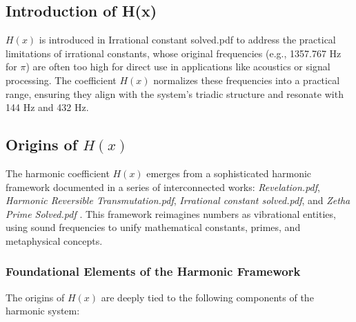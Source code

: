 \subsection{Introduction of H(x)}
\( H(x) \) is introduced in Irrational constant solved.pdf to address the practical limitations of irrational constants, whose original frequencies (e.g., 1357.767 Hz for \( \pi \)) are often too high for direct use in applications like acoustics or signal processing. The coefficient \( H(x) \) normalizes these frequencies into a practical range, ensuring they align with the system’s triadic structure and resonate with 144 Hz and 432 Hz.

\subsection{Origins of \( H(x) \)}
\label{subsec:h_x_origins}
The harmonic coefficient \( H(x) \) emerges from a sophisticated harmonic framework documented in a series of interconnected works: \textit{Revelation.pdf}, \textit{Harmonic Reversible Transmutation.pdf}, \textit{Irrational constant solved.pdf}, and \textit{Zetha Prime Solved.pdf} \cite{revelation, harmonic_reversible, irrational_constant_solved, zetha_prime}. This framework reimagines numbers as vibrational entities, using sound frequencies to unify mathematical constants, primes, and metaphysical concepts.

\subsubsection{Foundational Elements of the Harmonic Framework}
The origins of \( H(x) \) are deeply tied to the following components of the harmonic system:


